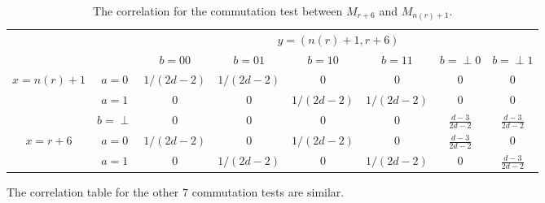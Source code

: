 \documentclass[11pt,letterpaper]{article}
\newcommand{\ket}[1]{|#1\rangle}
\newcommand{\bra}[1]{\langle#1|}
\newcommand{\ketbra}[2]{|#1\rangle\langle#2|}
\newcommand{\1}{\mathbb{1}}
\newcommand{\nr}{n(r)}
\theoremstyle{definition}
\begin{document}
\begin{table}[H]
\begin{center}
\begin{tabular}{|c|c||c|c|c|c|c|c|}
\hline
\multicolumn{2}{|c|}{} &
\multicolumn{6}{|c|}{$y=(\nr+1, r+6)$}\\
\cline{3-8}
\multicolumn{2}{|c|}{} &
$b = 00$ & $b=01$ & 
$b = 10$ & $b=11$ &
$b = \perp0$ & $b= \perp1$   \\
\hline
\hline
\multirow{3}{*}{$x = \nr+1$} & $a=0$ & $1/(2d-2)$ & $1/(2d-2)$ &  $0$
& $0$ & $0$ & $0$  \\
\cline{2-8}
&$a=1$ & $0$ & $0 $ & $1/(2d-2)$ 
&  $1/(2d-2)$ & $0$ & $0$  \\
\cline{2-8}
&$b=\perp$ & 0 & 0 & $0$ 
&  0 & $\frac{d-3}{2d-2}$ & $\frac{d-3}{2d-2} $  \\
\hline
\multirow{2}{*}{$x = r+6$} & $a=0$ & $1/(2d-2)$ & $0$ & $1/(2d-2)$ 
& $0$ & $\frac{d-3}{2d-2}$ & 0  \\
\cline{2-8}
&$a=1$ & $0$ & $1/(2d-2)$ & $0$ 
&  $1/(2d-2)$ & $0$ & $\frac{d-3}{2d-2}$  \\
\hline
\end{tabular}
\end{center}
\caption{The correlation for the commutation test between $M_{r+6}$ and $M_{\nr+1}$.}
\end{table}
The correlation table for the other $7$ commutation tests are similar.
\end{document}
